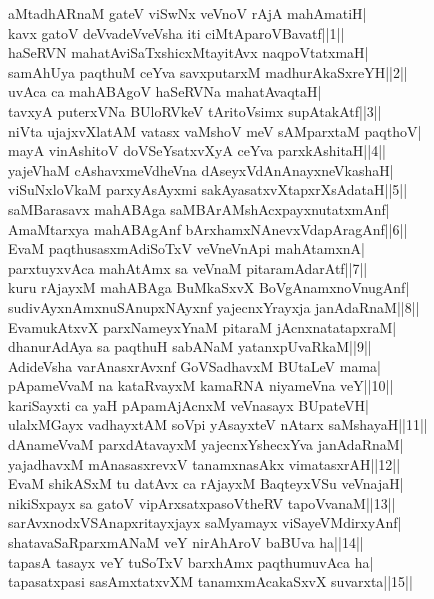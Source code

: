 \documentclass{article}
\begin{document}
aMtadhARnaM gateV viSwNx veVnoV rAjA mahAmatiH|\\
kavx gatoV deVvadeVveVsha iti ciMtAparoVBavatf||1||\\
haSeRVN mahatAviSaTxshicxMtayitAvx naqpoVtatxmaH|\\
samAhUya paqthuM ceYva savxputarxM madhurAkaSxreYH||2||\\
uvAca ca mahABAgoV haSeRVNa mahatAvaqtaH|\\
tavxyA puterxVNa BUloRVkeV tAritoVsimx supAtakAtf||3||\\
niVta ujajxvXlatAM vatasx vaMshoV meV sAMparxtaM paqthoV|\\
mayA vinAshitoV doVSeYsatxvXyA ceYva parxkAshitaH||4||\\
yajeVhaM cAshavxmeVdheVna dAseyxVdAnAnayxneVkashaH|\\
viSuNxloVkaM parxyAsAyxmi sakAyasatxvXtapxrXsAdataH||5||\\
saMBarasavx mahABAga saMBArAMshAcxpayxnutatxmAnf|\\
AmaMtarxya mahABAgAnf bArxhamxNAnevxVdapAragAnf||6||\\
EvaM paqthusasxmAdiSoTxV veVneVnApi mahAtamxnA|\\
parxtuyxvAca mahAtAmx sa veVnaM pitaramAdarAtf||7||\\
kuru rAjayxM mahABAga BuMkaSxvX BoVgAnamxnoVnugAnf|\\
sudivAyxnAmxnuSAnupxNAyxnf yajecnxYrayxja janAdaRnaM||8||\\
EvamukAtxvX parxNameyxYnaM pitaraM jAcnxnatatapxraM|\\
dhanurAdAya sa paqthuH sabANaM yatanxpUvaRkaM||9||\\
AdideVsha varAnasxrAvxnf GoVSadhavxM BUtaLeV mama|\\
pApameVvaM na kataRvayxM kamaRNA niyameVna veY||10||\\
kariSayxti ca yaH pApamAjAcnxM veVnasayx BUpateVH|\\
ulalxMGayx vadhayxtAM soVpi yAsayxteV nAtarx saMshayaH||11||\\
dAnameVvaM parxdAtavayxM yajecnxYshecxYva janAdaRnaM|\\
yajadhavxM mAnasasxrevxV tanamxnasAkx vimatasxrAH||12||\\
EvaM shikASxM tu datAvx ca rAjayxM BaqteyxVSu veVnajaH|\\
nikiSxpayx sa gatoV vipArxsatxpasoVtheRV tapoVvanaM||13||\\
sarAvxnodxVSAnapxritayxjayx saMyamayx viSayeVMdirxyAnf|\\
shatavaSaRparxmANaM veY nirAhAroV baBUva ha||14||\\
tapasA tasayx veY tuSoTxV barxhAmx paqthumuvAca ha|\\
tapasatxpasi sasAmxtatxvXM tanamxmAcakaSxvX suvarxta||15||\\
\end{document}
